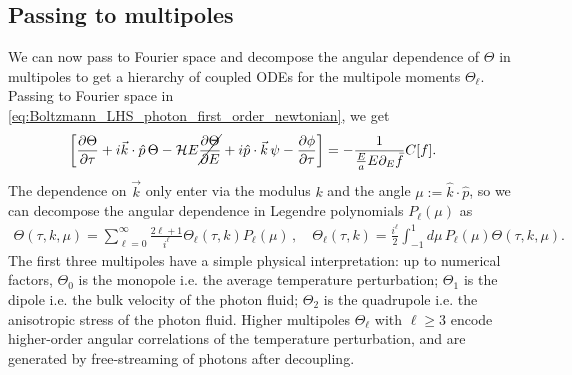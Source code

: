 \subsection{Passing to multipoles}
We can now pass to Fourier space and decompose the angular dependence of $\Theta$ in multipoles to get a hierarchy of coupled ODEs for the multipole moments $\Theta_\ell$.
Passing to Fourier space in \eqref{eq:Boltzmann_LHS_photon_first_order_newtonian}, we get
{\small
\begin{align}\label{eq:Boltzmann_LHS_photon_first_order_newtonian_Fourier}
\begin{aligned}
    &\bigg[\frac{\partial\Theta}{\partial \tau}+i\vec{k}\cdot\hat{p}\,\Theta-\mathcal{H}E\cancel{\frac{\partial \Theta}{\partial E}}+i\hat{p}\cdot\vec{k}\,\psi-\frac{\partial \phi}{\partial\tau}\bigg] = - \frac{1}{\tfrac{E}{a}E\partial_E\bar{f}} C[f].
\end{aligned}
\end{align}}
The dependence on $\vec{k}$ only enter via the modulus $k$ and the angle $\mu:=\hat{k}\cdot\hat{p}$, so we can decompose the angular dependence in Legendre polynomials $P_\ell(\mu)$ as
{\small
\begin{align}
    \Theta(\tau, k, \mu) = \sum_{\ell=0}^\infty \frac{2\ell+1}{i^\ell} \Theta_\ell(\tau, k) P_\ell(\mu)\,,\quad
    \Theta_\ell(\tau, k) = \frac{i^\ell}{2}\int_{-1}^1 d\mu\, P_\ell(\mu) \Theta(\tau, k, \mu).
\end{align}}
The first three multipoles have a simple physical interpretation: up to numerical factors, $\Theta_0$ is the monopole i.e. the average temperature perturbation; $\Theta_1$ is the dipole i.e. the bulk velocity of the photon fluid; $\Theta_2$ is the quadrupole i.e. the anisotropic stress of the photon fluid.
Higher multipoles $\Theta_\ell$ with $\ell\geq 3$ encode higher-order angular correlations of the temperature perturbation, and are generated by free-streaming of photons after decoupling.

